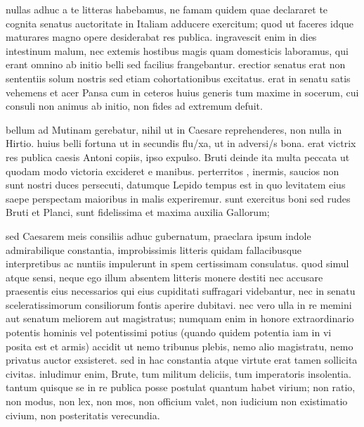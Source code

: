 


 nullas adhuc a te litteras habebamus, ne famam quidem quae declararet te cognita senatus auctoritate in Italiam adducere exercitum; quod ut faceres idque maturares magno opere desiderabat res publica. ingravescit enim in dies intestinum malum, nec extemis hostibus magis quam domesticis laboramus, qui erant omnino ab initio belli sed facilius frangebantur. erectior senatus erat non sententiis solum nostris sed etiam cohortationibus excitatus. erat in senatu satis vehemens et acer Pansa cum in ceteros huius generis tum maxime in socerum, cui consuli non animus ab initio, non fides ad extremum defuit.

 bellum ad Mutinam gerebatur, nihil ut in Caesare reprehenderes, non nulla in Hirtio. huius belli fortuna ut in secundis flu/xa, ut in adversi/s bona. erat victrix res publica caesis Antoni copiis, ipso expulso. Bruti deinde ita multa peccata ut quodam modo victoria excideret e manibus. perterritos , inermis, saucios non sunt nostri duces persecuti, datumque Lepido tempus est in quo levitatem eius saepe perspectam maioribus in malis experiremur. sunt exercitus boni sed rudes Bruti et Planci, sunt fidelissima et maxima auxilia Gallorum;

 sed Caesarem meis consiliis adhuc gubernatum, praeclara ipsum indole admirabilique constantia, improbissimis litteris quidam fallacibusque interpretibus ac nuntiis impulerunt in spem certissimam consulatus. quod simul atque sensi, neque ego illum absentem litteris monere destiti nec accusare praesentis eius necessarios qui eius cupiditati suffragari videbantur, nec in senatu sceleratissimorum consiliorum fontis aperire dubitavi. nec vero ulla in re memini aut senatum meliorem aut magistratus; numquam enim in honore extraordinario potentis hominis vel potentissimi potius (quando quidem potentia iam in vi posita est et armis) accidit ut nemo tribunus plebis, nemo alio magistratu, nemo privatus auctor exsisteret. sed in hac constantia atque virtute erat tamen sollicita civitas. inludimur enim, Brute, tum militum deliciis, tum imperatoris insolentia. tantum quisque se in re publica posse postulat quantum habet virium; non ratio, non modus, non lex, non mos, non officium valet, non iudicium non existimatio civium, non posteritatis verecundia.

